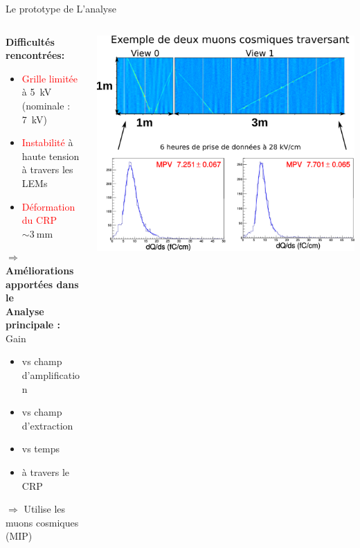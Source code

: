     \begin{frame}{Le prototype de \TOO{}}{L'analyse}
       	\begin{scriptsize}
       		\vfill
       		\begin{columns}
       			\begin{column}{0.32\textwidth}
       				\textbf{Difficultés rencontrées:} 
       				\begin{itemize}
       					\item \textcolor{red}{Grille limitée} à \SI{5}{\kilo\volt} (nominale : \SI{7}{\kilo\volt})
       					\item \textcolor{red}{Instabilité} à haute tension à travers les LEMs
       					\item \textcolor{red}{Déformation du CRP} $\sim\SI{3}{\milli\meter}$
       				\end{itemize}
       				\textbf{$\Rightarrow$ Améliorations apportées dans le \SSS{}} \\
       				\vspace{0.3cm}
       				\textbf{Analyse principale :} Gain
       				\begin{itemize}
           				\item vs champ d'amplification
           				\item vs champ d'extraction
           				\item vs temps
           				\item à travers le CRP
       				\end{itemize}
       				$\Rightarrow$ Utilise les muons cosmiques (MIP)
       			\end{column}\hfill
       			\begin{column}{0.72\textwidth}
       				\includegraphics[width=\textwidth]{./pictures/run840.png}\\
       			\end{column}
       		\end{columns}
	    \end{scriptsize}
    \end{frame}

